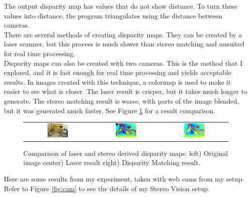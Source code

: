 \documentclass[11pt,fleqn]{article}
\begin{document}
The output disparity map has values that do not show distance. To turn these values into distance, the program triangulates using the distance between cameras.\\[5pt]
%
There are several methods of creating disparity maps. They can be created by a laser scanner, but this process is much slower than stereo matching and unsuited for real time processing.\\
Disparity maps can also be created with two cameras. This is the method that I explored, and it is fast enough for real time processing and yields acceptable results. In images created with this technique, a colormap is used to make it easier to see what is closer.
The laser result is crisper, but it takes much longer to generate. The stereo matching result is worse, with parts of the image blended, but it was generated much faster. See Figure \ref{fig:result1} for a result comparison.
\begin{figure}
\begin{mdframed}
\centering
\setlength{}
\begin{tabular}{ccc}
\includegraphics[width=0.33\textwidth]{images/_im0-600.jpg} &
\includegraphics[width=0.33\textwidth]{images/disp0GT-600.jpg} &
\includegraphics[width=0.33\textwidth]{images/_disp-600.jpg} \\[2pt]
\end{tabular}
\caption[Comparison of laser and stereo derived disparity maps]{Comparison of laser and stereo derived disparity maps: left) Original image center) Laser result right) Disparity Matching result.}
\label{fig:result1}
\end{mdframed}
\end{figure}
\newpage
Here are some results from my experiment, taken with web cams from my setup. Refer to Figure \ref{fig:cam} to see the details of my Stereo Vision setup.
\end{document}
